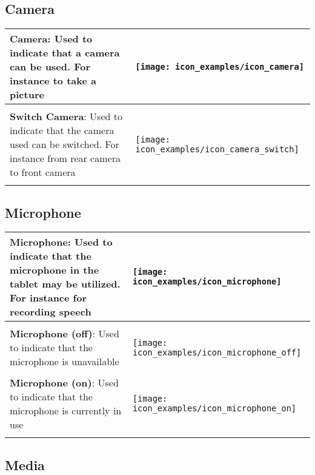 \subsection{Camera}

\begin{longtable}{m{\textwidth-2.2cm} m{1.5cm}}
	\textbf{Camera}: Used to indicate that a camera can be used. For instance to take a picture & \parbox[c]{1.2cm}{
	\texttt{[image: icon\_examples/icon\_camera]}} \\[0.6cm] \hline \\[-1em] 

	\textbf{Switch Camera}: Used to indicate that the camera used can be switched. For instance from rear camera to front camera & \parbox[c]{1.7cm}{
	\texttt{[image: icon\_examples/icon\_camera\_switch]}} \\[0.6cm] \hline \\[-1em] 
\end{longtable}


\subsection{Microphone}

\begin{longtable}{m{\textwidth-2.2cm} m{1.5cm}}
	\textbf{Microphone}: Used to indicate that the microphone in the tablet may be utilized. For instance for recording speech & \parbox[c]{1.2cm}{
	\texttt{[image: icon\_examples/icon\_microphone]}} \\[0.6cm] \hline \\[-1em]

	\textbf{Microphone (off)}: Used to indicate that the microphone is unavailable & \parbox[c]{1.2cm}{
	\texttt{[image: icon\_examples/icon\_microphone\_off]}} \\[0.6cm] \hline \\[-1em]

	\textbf{Microphone (on)}: Used to indicate that the microphone is currently in use & \parbox[c]{1.2cm}{
	\texttt{[image: icon\_examples/icon\_microphone\_on]}} \\[0.6cm] \hline \\[-1em] 
\end{longtable}


\subsection{Media}

